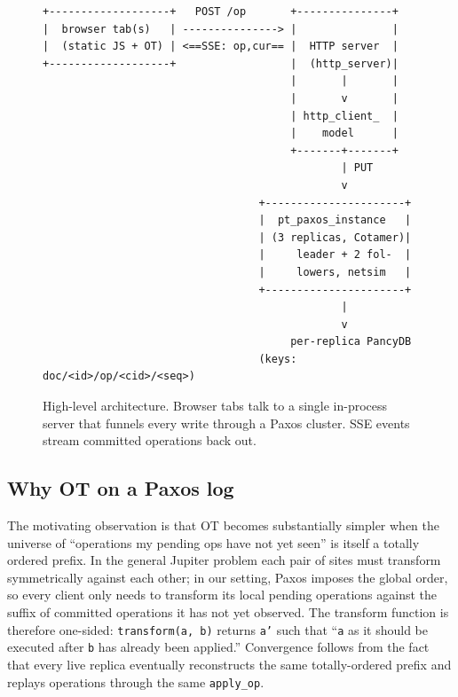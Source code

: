 \documentclass[11pt]{article}
\newcommand{\code}[1]{\texttt{#1}}
\begin{document}
\begin{figure}[h]
\centering
\begin{lstlisting}[basicstyle=\ttfamily\scriptsize]
+-------------------+   POST /op       +---------------+
|  browser tab(s)   | ---------------> |               |
|  (static JS + OT) | <==SSE: op,cur== |  HTTP server  |
+-------------------+                  |  (http_server)|
                                       |       |       |
                                       |       v       |
                                       | http_client_  |
                                       |    model      |
                                       +-------+-------+
                                               | PUT
                                               v
                                  +----------------------+
                                  |  pt_paxos_instance   |
                                  | (3 replicas, Cotamer)|
                                  |     leader + 2 fol-  |
                                  |     lowers, netsim   |
                                  +----------------------+
                                               |
                                               v
                                       per-replica PancyDB
                                  (keys: doc/<id>/op/<cid>/<seq>)
\end{lstlisting}
\caption{High-level architecture. Browser tabs talk to a single in-process server that funnels every write through a Paxos cluster. SSE events stream committed operations back out.}
\label{fig:arch}
\end{figure}

\subsection{Why OT on a Paxos log}

The motivating observation is that OT becomes substantially simpler when the universe of ``operations my pending ops have not yet seen'' is itself a totally ordered prefix. In the general Jupiter problem each pair of sites must transform symmetrically against each other; in our setting, Paxos imposes the global order, so every client only needs to transform its local pending operations against the suffix of committed operations it has not yet observed. The transform function is therefore one-sided: \code{transform(a, b)} returns \code{a'} such that ``\code{a} as it should be executed after \code{b} has already been applied.'' Convergence follows from the fact that every live replica eventually reconstructs the same totally-ordered prefix and replays operations through the same \code{apply\_op}.
\end{document}
